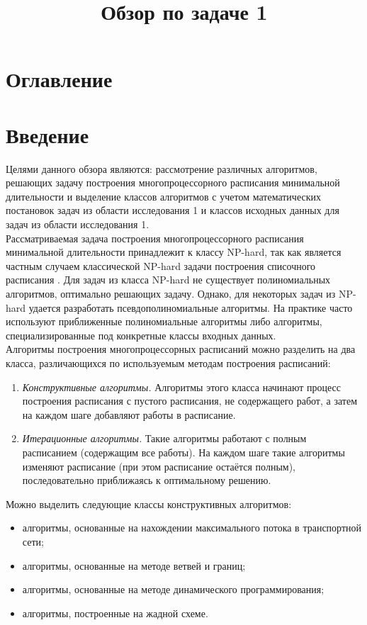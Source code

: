 \documentclass{article}
\title{Обзор по задаче 1}
\begin{document}
  \maketitle
  \newpage
  \section*{Оглавление}
  \tableofcontents
  \newpage
  \section{Введение}
  Целями данного обзора являются: рассмотрение различных алгоритмов, решающих задачу построения многопроцессорного расписания минимальной длительности и выделение классов алгоритмов с учетом математических постановок задач из области исследования 1 и классов исходных данных для задач из области исследования 1.\\
  Рассматриваемая задача построения многопроцессорного расписания минимальной длительности принадлежит к классу NP-hard, так как является частным случаем классической NP-hard задачи построения списочного расписания \cite{Shakhbazyan_1981}. Для задач из класса NP-hard не существует полиномиальных алгоритмов, оптимально решающих задачу. Однако, для некоторых задач из NP-hard удается разработать псевдополиномиальные алгоритмы. На практике часто используют приближенные полиномиальные алгоритмы либо алгоритмы, специализированные под конкретные классы входных данных.\\
  Алгоритмы построения многопроцессорных расписаний можно разделить на два класса, различающихся по используемым методам построения расписаний:
  \begin{enumerate}
    \item \textit{Конструктивные алгоритмы.} Алгоритмы этого класса начинают процесс построения расписания с пустого расписания, не содержащего работ, а затем на каждом шаге добавляют работы в расписание.
    \item \textit{Итерационные алгоритмы.} Такие алгоритмы работают с полным расписанием (содержащим все работы). На каждом шаге такие алгоритмы изменяют расписание (при этом расписание остаётся полным), последовательно приближаясь к оптимальному решению.
  \end{enumerate}
  Можно выделить следующие классы конструктивных алгоритмов:
  \begin{itemize}
    \item алгоритмы, основанные на нахождении максимального потока в транспортной сети;
    \item алгоритмы, основанные на методе ветвей и границ;
    \item алгоритмы, основанные на методе динамического программирования;
    \item алгоритмы, построенные на жадной схеме.
  \end{itemize}
\end{document}
